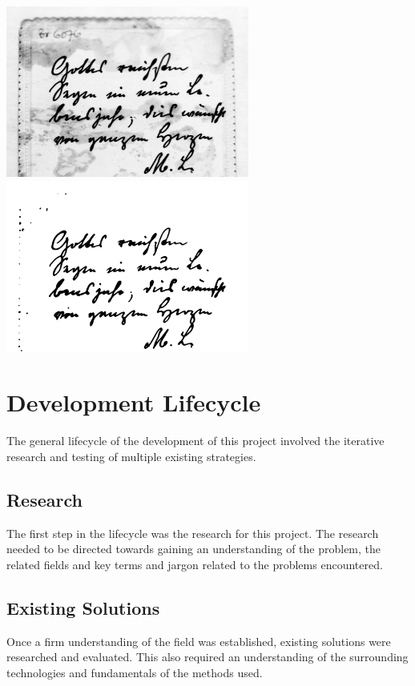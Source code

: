 \documentclass[a4paper]{article}
\begin{document}
\begin{multicols}{2}
    \noindent
    \begin{minipage}{\linewidth}
        \centering
        \includegraphics[width=8cm]{original.png}
        \includegraphics[width=8cm]{output.png}
        \label{fig:7}
    \end{minipage}

    \newpage

    \section{Development Lifecycle}
    The general lifecycle of the development of this project involved the iterative research and testing of multiple existing strategies.

    \subsection{Research}
    The first step in the lifecycle was the research for this project. The research needed to be directed towards gaining an understanding of the problem, the related fields and key terms and jargon related to the problems encountered.

    \subsection{Existing Solutions}
    Once a firm understanding of the field was established, existing solutions were researched and evaluated. This also required an understanding of the surrounding technologies and fundamentals of the methods used.


\end{multicols}
\end{document}
